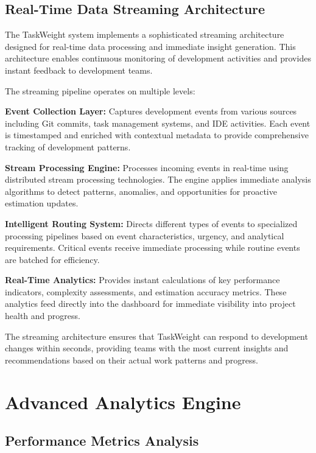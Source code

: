 \documentclass[12pt,a4paper]{article}
\begin{document}
\subsection{Real-Time Data Streaming Architecture}

The TaskWeight system implements a sophisticated streaming architecture designed for real-time data processing and immediate insight generation. This architecture enables continuous monitoring of development activities and provides instant feedback to development teams.

The streaming pipeline operates on multiple levels:

\textbf{Event Collection Layer:} Captures development events from various sources including Git commits, task management systems, and IDE activities. Each event is timestamped and enriched with contextual metadata to provide comprehensive tracking of development patterns.

\textbf{Stream Processing Engine:} Processes incoming events in real-time using distributed stream processing technologies. The engine applies immediate analysis algorithms to detect patterns, anomalies, and opportunities for proactive estimation updates.

\textbf{Intelligent Routing System:} Directs different types of events to specialized processing pipelines based on event characteristics, urgency, and analytical requirements. Critical events receive immediate processing while routine events are batched for efficiency.

\textbf{Real-Time Analytics:} Provides instant calculations of key performance indicators, complexity assessments, and estimation accuracy metrics. These analytics feed directly into the dashboard for immediate visibility into project health and progress.

The streaming architecture ensures that TaskWeight can respond to development changes within seconds, providing teams with the most current insights and recommendations based on their actual work patterns and progress.

\section{Advanced Analytics Engine}

\subsection{Performance Metrics Analysis}
\end{document}
